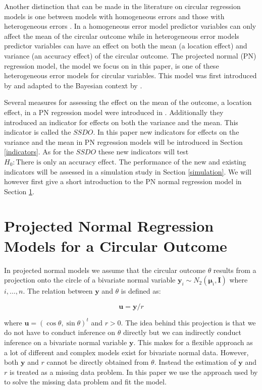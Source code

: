 \documentclass[]{interact}
\begin{document}
Another distinction that can be made in the literature on circular regression
models is one between models with homogeneous errors and those with
heterogeneous errors \cite{rivest2015general}. In a homogeneous error model predictor
variables can only affect the mean of the circular outcome while in heterogeneous
error models predictor variables can have an effect on both the mean  (a
location effect) and variance (an accuracy effect) of the circular outcome. The
projected normal (PN) regression model, the model we focus on in this paper, is
one of these heterogeneous error models for circular variables. This model was
first introduced by \cite{presnell1998projected} and adapted to the Bayesian context
by \cite{nunez2011bayesian}.

Several measures for assessing the effect on the mean of the outcome, a location
effect, in a PN regression model were introduced in \cite{CremersMulderKlugkist2017}.
Additionally they introduced an indicator for effects on both the variance and
the mean. This indicator is called the $SSDO$. In this paper new indicators for
effects on the variance and the mean in PN regression models will be introduced
in Section \ref{indicators}. As for the $SSDO$ these new indicators will test
\textit{$H_0: \text{There is only an accuracy effect}$}. The performance of the
new and existing indicators will be assessed in a simulation study in Section
\ref{simulation}. We will however first give a short introduction to the PN
normal regression model in Section \ref{regmodel}.





\section{Projected Normal Regression Models for a Circular Outcome}\label{regmodel}

In projected normal models we assume that the circular outcome $\theta$ results
from a projection onto the circle of a bivariate normal variable
$\boldsymbol{y}_i \sim N_2(\boldsymbol{\mu}_i, \boldsymbol{I})$ where $i, \dots,
n$. The relation between $\boldsymbol{y}$ and $\theta$ is defined as:


\begin{equation}\label{projection}
\boldsymbol{u} = \boldsymbol{y}/r
\end{equation}

\noindent where $\boldsymbol{u} = (\cos\theta, \sin\theta)^t$ and $r > 0$. The idea behind
this projection is that we do not have to conduct inference on $\theta$ directly
but we can indirectly conduct inference on a bivariate normal variable
$\boldsymbol{y}$. This makes for a flexible approach as a lot of different and
complex models exist for bivariate normal data. However, both $\boldsymbol{y}$
and $r$ cannot be directly obtained from $\theta$. Instead the estimation of
$\boldsymbol{y}$ and $r$ is treated as a missing data problem. In this paper we
use the approach used by \cite{CremersMulderKlugkist2017} to solve the missing data
problem and fit the model.
\end{document}
